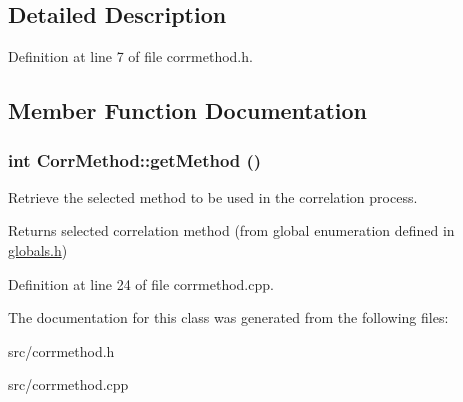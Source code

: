 \subsection{Detailed Description}


Definition at line 7 of file corrmethod.h.

\subsection{Member Function Documentation}
\hypertarget{classCorrMethod_a3eeafdd901560c1fa92be75d4ed58872}{
\subsubsection[{getMethod}]{\setlength{\rightskip}{0pt plus 5cm}int CorrMethod::getMethod ()}}
\label{classCorrMethod_a3eeafdd901560c1fa92be75d4ed58872}


Retrieve the selected method to be used in the correlation process. \begin{DoxyReturn}{Returns}
selected correlation method (from global enumeration defined in \hyperlink{globals_8h_source}{globals.h}) 
\end{DoxyReturn}


Definition at line 24 of file corrmethod.cpp.

The documentation for this class was generated from the following files:\begin{DoxyCompactItemize}
\item 
src/corrmethod.h\item 
src/corrmethod.cpp\end{DoxyCompactItemize}
